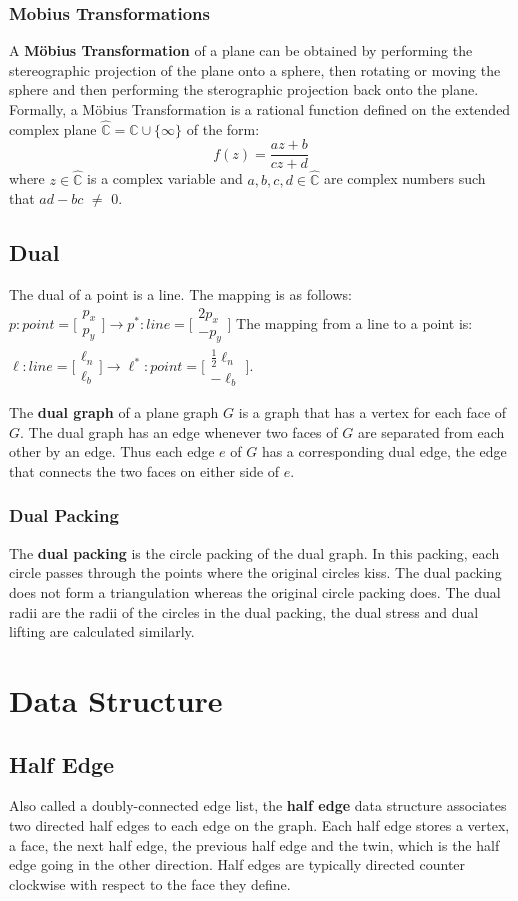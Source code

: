 \documentclass{article}
\newcommand{\vect}[2]{\bigl[\begin{smallmatrix}#1\\#2\end{smallmatrix}\bigr]}
\newcommand{\C}{\mathbb{C}}
\newcommand{\CP}{\hat{\mathbb{C}}}
\begin{document}
    \subsubsection{Mobius Transformations}
    A \textbf{M\"{o}bius Transformation} of a plane can be obtained by performing the stereographic projection of the plane onto a sphere, then rotating or moving the sphere and then performing the sterographic projection back onto the plane. 
    Formally, a M\"{o}bius Transformation is a rational function defined on the extended complex plane $\CP = \C\cup\{\infty\}$ of the form:
    \begin{equation} 
    	f(z) = \frac{az+b}{cz+d}
    \end{equation}
    where $z\in\CP$ is a complex variable and $a,b,c,d\in\CP$ are complex numbers such that $ad - bc$ $\neq$ $0$.
 
 \subsection{Dual}
  The dual of a point is a line. The mapping is as follows: $p : point = \vect{p_x}{p_y} \rightarrow p^* : line = \vect{2p_x}{-p_y}$ The mapping from a line to a point is: $\ell : line = \vect{\ell_n}{\ell_b} \rightarrow \ell^* : point = \vect{\frac{1}{2}\ell_n}{-\ell_b}$.
  
  The \textbf{dual graph} of a plane graph $G$ is a graph that has a vertex for each face of $G$. 
  The dual graph has an edge whenever two faces of $G$ are separated from each other by an edge. 
  Thus each edge $e$ of $G$ has a corresponding dual edge, the edge that connects the two faces on either side of $e$. 

  \subsubsection{Dual Packing}
  The \textbf{dual packing} is the circle packing of the dual graph. 
  In this packing, each circle passes through the points where the original circles kiss. 
  The dual packing does not form a triangulation whereas the original circle packing does.
  The dual radii are the radii of the circles in the dual packing, the dual stress and dual lifting are calculated similarly.

\section{Data Structure}
 \subsection{Half Edge}
  Also called a doubly-connected edge list, the \textbf{half edge} data structure associates two directed half edges to each edge on the graph. 
  Each half edge stores a vertex, a face, the next half edge, the previous half edge and the twin, which is the half edge going in the other direction. 
  Half edges are typically directed counter clockwise with respect to the face they define.
\end{document}
